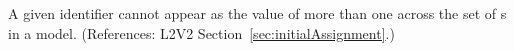 A given identifier cannot appear as the value of more than one
  across the set of \InitialAssignment{}s in a model.
(References: L2V2 Section~\ref{sec:initialAssignment}.)
